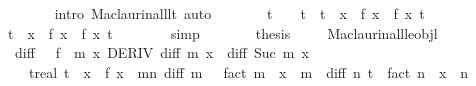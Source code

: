 \begin{isabellebody}
\ \ \ \ \ \ \isamarkupfalse%
\ {\isacharparenleft}{\kern0pt}intro\ Maclaurin{\isacharunderscore}{\kern0pt}all{\isacharunderscore}{\kern0pt}lt{\isacharparenright}{\kern0pt}\ auto\isanewline
\ \ \ \ \isamarkupfalse%
\ \isamarkupfalse%
\ t\ \ {\isachardoublequoteopen}{}\ {\isacharless}{\kern0pt}\ {\isasymbar}t{\isasymbar}\ {\isasymand}\ {\isasymbar}t{\isasymbar}\ {\isacharless}{\kern0pt}\ {\isasymbar}x{\isasymbar}\ {\isasymand}\ f\ x\ {\isacharequal}{\kern0pt}\ {\isacharquery}{\kern0pt}f\ x\ t{\isachardoublequoteclose}\ \isacommand{{\isachardot}{\kern0pt}{\isachardot}{\kern0pt}}\isamarkupfalse%
\isanewline
\ \ \ \ \isamarkupfalse%
\ \isamarkupfalse%
\ {\isachardoublequoteopen}{\isasymbar}t{\isasymbar}\ {\isasymle}\ {\isasymbar}x{\isasymbar}\ {\isasymand}\ f\ x\ {\isacharequal}{\kern0pt}\ {\isacharquery}{\kern0pt}f\ x\ t{\isachardoublequoteclose}\isanewline
\ \ \ \ \ \ \isamarkupfalse%
\ simp\isanewline
\ \ \ \ \isamarkupfalse%
\ \isamarkupfalse%
\ {\isacharquery}{\kern0pt}thesis\ \isacommand{{\isachardot}{\kern0pt}{\isachardot}{\kern0pt}}\isamarkupfalse%
\isanewline
\ \ \isamarkupfalse%
\isanewline
{}\isamarkupfalse%
%
\endisatagproof
{\isafoldproof}%
%
\isadelimproof
\isanewline
%
\endisadelimproof
\isanewline
{}\isamarkupfalse%
\ Maclaurin{\isacharunderscore}{\kern0pt}all{\isacharunderscore}{\kern0pt}le{\isacharunderscore}{\kern0pt}objl{\isacharcolon}{\kern0pt}\isanewline
\ \ {\isachardoublequoteopen}diff\ {}\ {\isacharequal}{\kern0pt}\ f\ {\isasymand}\ {\isacharparenleft}{\kern0pt}{\isasymforall}m\ x{\isachardot}{\kern0pt}\ DERIV\ {\isacharparenleft}{\kern0pt}diff\ m{\isacharparenright}{\kern0pt}\ x\ {\isacharcolon}{\kern0pt}{\isachargreater}{\kern0pt}\ diff\ {\isacharparenleft}{\kern0pt}Suc\ m{\isacharparenright}{\kern0pt}\ x{\isacharparenright}{\kern0pt}\ {\isasymlongrightarrow}\isanewline
\ \ \ \ {\isacharparenleft}{\kern0pt}{\isasymexists}t{\isacharcolon}{\kern0pt}{\isacharcolon}{\kern0pt}real{\isachardot}{\kern0pt}\ {\isasymbar}t{\isasymbar}\ {\isasymle}\ {\isasymbar}x{\isasymbar}\ {\isasymand}\ f\ x\ {\isacharequal}{\kern0pt}\ {\isacharparenleft}{\kern0pt}{\isasymSum}m{\isacharless}{\kern0pt}n{\isachardot}{\kern0pt}\ {\isacharparenleft}{\kern0pt}diff\ m\ {}\ {\isacharslash}{\kern0pt}\ fact\ m{\isacharparenright}{\kern0pt}\ {\isacharasterisk}{\kern0pt}\ x\ {\isacharcircum}{\kern0pt}\ m{\isacharparenright}{\kern0pt}\ {\isacharplus}{\kern0pt}\ {\isacharparenleft}{\kern0pt}diff\ n\ t\ {\isacharslash}{\kern0pt}\ fact\ n{\isacharparenright}{\kern0pt}\ {\isacharasterisk}{\kern0pt}\ x\ {\isacharcircum}{\kern0pt}\ n{\isacharparenright}{\kern0pt}{\isachardoublequoteclose}\isanewline

\end{isabellebody}
